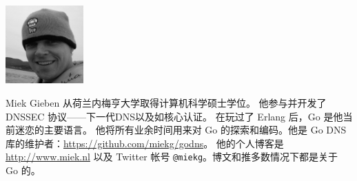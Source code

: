 \includegraphics[width=3cm]{fig/avatar-miekg-300x300}

Miek Gieben 从荷兰内梅亨大学取得计算机科学硕士学位。
他参与并开发了 DNSSEC 协议——下一代DNS以及如核心认证\cite{RFC4641}。
在玩过了 Erlang 后，Go 是他当前迷恋的主要语言。
他将所有业余时间用来对 Go 的探索和编码。他是 Go DNS 库的维护者：\url{https://github.com/miekg/godns}。
他的个人博客是 \url{http://www.miek.nl} 以及 Twitter 帐号 \texttt{@miekg}。博文和推多数情况下都是关于 Go 的。
